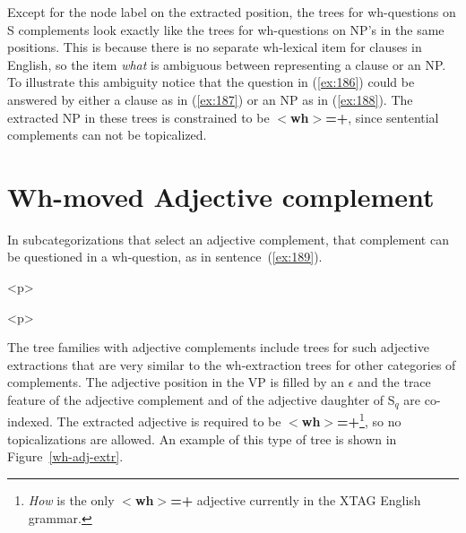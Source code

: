 Except for the node label on the extracted position, the trees for wh-questions 
on S complements look exactly like the trees for wh-questions on NP's in the 
same positions.  This is because there is no separate wh-lexical item for 
clauses in English, so the item {\it what} is ambiguous between representing a 
clause or an NP.  To illustrate this ambiguity notice that the question in 
(\ref{ex:186}) could be answered by either a clause as in (\ref{ex:187}) or an NP as in 
(\ref{ex:188}).  The extracted NP in these trees is constrained to be {\bf $<$wh$>$=+}, since sentential complements can not be topicalized. 
 
\beginsentences
{}\label{ex:186} 
\label{ex:187} 
\label{ex:188} 
\endsentences

 
 
 
 
\section{Wh-moved Adjective complement} 
In subcategorizations that select an adjective complement, that 
complement can be questioned in a wh-question, as in sentence~(\ref{ex:189}). 
 
\beginsentences
{}\label{ex:189} 
\endsentences

 
\begin{rawhtml} <p> \end{rawhtml}
\centering 
\mbox{} 
\begin{rawhtml} <dl> <dt>{Predicative Adjective tree with extracted adjective: $\alpha$WA1nx0Vax1 <p> </dl> \end{rawhtml}
\label{wh-adj-extr} 
\label{1;7,14} 
\begin{rawhtml} <p> \end{rawhtml}
 
 
The tree families with adjective complements include trees for such adjective 
extractions that are very similar to the wh-extraction trees for other 
categories of complements.  The adjective position in the VP is filled by an 
{\it $\epsilon$} and the trace feature of the adjective complement and of the 
adjective daughter of S$_{q}$ are co-indexed.  The extracted adjective is 
required to be {\bf $<$wh$>$=+}\footnote{{\it How} is the only {\bf $<$wh$>$=+} adjective currently in the XTAG English grammar.}, so no 
topicalizations are allowed.  An example of this type of tree is shown in 
Figure~\ref{wh-adj-extr}. 
 
 
 
 
 
 
 
 
 
